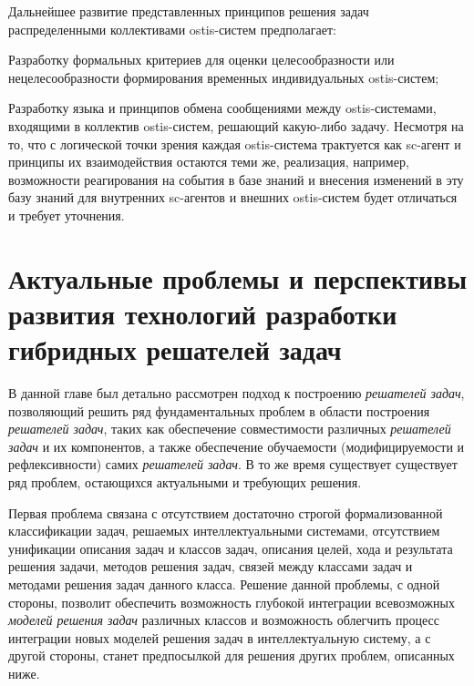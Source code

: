 Дальнейшее развитие представленных принципов решения задач распределенными коллективами ostis-систем предполагает:
\begin{textitemize}
	\item Разработку формальных критериев для оценки целесообразности или нецелесообразности формирования временных индивидуальных ostis-систем;
	\item Разработку языка и принципов обмена сообщениями между ostis-системами, входящими в коллектив ostis-систем, решающий какую-либо задачу. Несмотря на то, что с логической точки зрения каждая ostis-система трактуется как sc-агент и принципы их взаимодействия остаются теми же, реализация, например, возможности реагирования на события в базе знаний и внесения изменений в эту базу знаний для внутренних sc-агентов и внешних ostis-систем будет отличаться и требует уточнения.
\end{textitemize}

\newpage
\section{Актуальные проблемы и перспективы развития технологий разработки гибридных решателей задач}
\label{sec_ps_future}

В данной главе был детально рассмотрен подход к построению \textit{решателей задач}, позволяющий решить ряд фундаментальных проблем в области построения \textit{решателей задач}, таких как обеспечение совместимости различных \textit{решателей задач} и их компонентов, а также обеспечение обучаемости (модифицируемости и рефлексивности) самих \textit{решателей задач}. В то же время существует существует ряд проблем, остающихся актуальными и требующих решения.

Первая проблема связана с отсутствием достаточно строгой формализованной классификации задач, решаемых интеллектуальными системами, отсутствием унификации описания задач и классов задач, описания целей, хода и результата решения задачи, методов решения задач, связей между классами задач и методами решения задач данного класса. Решение данной проблемы, с одной стороны, позволит обеспечить возможность глубокой интеграции всевозможных \textit{моделей решения задач} различных классов и возможность облегчить процесс интеграции новых моделей решения задач в интеллектуальную систему, а с другой стороны, станет предпосылкой для решения других проблем, описанных ниже.

